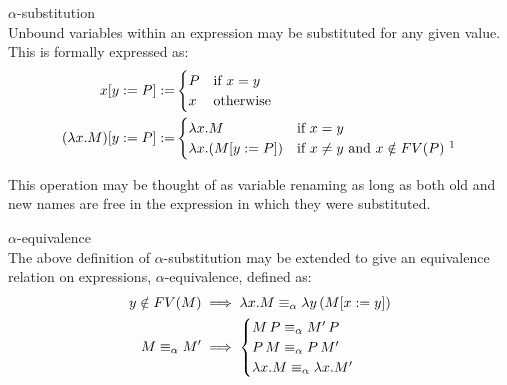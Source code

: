     \begin{definition}{$\alpha$-substitution\\}
        \label{lambda-alpha-relation}
        Unbound variables within an expression may be substituted for any given value.
        This is formally expressed as:
        \begin{align*}
            x[y \defeq P] \defeq &
                \begin{cases}
                    P & \text{if } x = y \\
                    x & \text{otherwise}
                \end{cases} \\
            (\lambda x . M)[y \defeq P] \defeq &
                \begin{cases}
                    \lambda x . M & \text{if } x = y \\
                    \lambda x . (M[y \defeq P]) & \text{if } x \neq y \text{ and } x \notin FV(P)~\footnotemark
                \end{cases}
        \end{align*}
    \end{definition}
    This operation may be thought of as variable renaming as long as both old and new names are free in the expression in which they were substituted.

    \begin{corollary*}{$\alpha$-equivalence\\}
        The above definition of $\alpha$-substitution may be extended to give an equivalence relation on expressions, $\alpha$-equivalence, defined as:
        \begin{align*}
            y \notin FV(M) & \implies \lambda x . M \equiv_\alpha \lambda y \, (M[x := y]) \\
            M \equiv_\alpha M' & \implies
                \begin{cases}
                    M \, P \equiv_\alpha M' \, P \\
                    P \, M \equiv_\alpha P \, M' \\
                    \lambda x . M \equiv_\alpha \lambda x. M'
                \end{cases}
        \end{align*}
    \end{corollary*}


